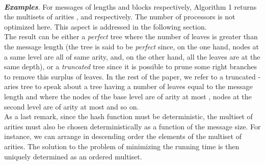 \documentclass{llncs}
\renewcommand{\paragraph}[1]{\noindent\textit{#1}.}
\begin{document}
~\\
\paragraph{\textbf{Examples}} For messages of lengths  and  blocks respectively, Algorithm 1 returns the multisets 
of arities ,  and  respectively.
The number of processors is not optimized here. This aspect is addressed in the following section. ~\\




The result can be either a \emph{perfect} tree where the number of leaves is greater than the message length (the tree is said to be \emph{perfect} since, on the one hand, 
nodes at a same level are all of same arity, and, on the other hand, all the leaves are at the same depth), or a \emph{truncated} tree since it 
is possible to prune some right branches to remove this surplus of leaves.
In the rest of the paper, we refer to a truncated -aries tree to speak about a tree having a number of leaves equal 
to the message length and where the nodes of the base level are of arity at most , nodes at the second level are of arity at most  and so on.~\\

As a last remark, since the hash function must be deterministic, the multiset of arities must also be chosen deterministically 
as a function of the message size. For instance, we can arrange in descending order the elements of the multiset of arities. 
The solution to the problem of minimizing the running time is then uniquely determined as an ordered multiset.
\end{document}
